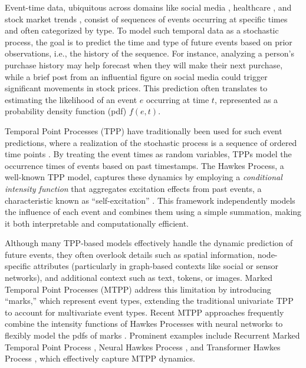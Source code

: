 Event-time data, ubiquitous across domains like social media \cite{seismic, snapnets}, healthcare \cite{bib:RMTPP, meng2023dynamic}, and stock market trends \cite{Bacry2014MarketIA, hawkesInFinance}, 
consist of sequences of events occurring at specific times and often categorized by type. 
To model such temporal data as a stochastic process, the goal is to predict the time and type of future events based on prior observations, i.e., the history of the sequence. 
For instance, analyzing a person’s purchase history may help forecast when they will make their next purchase, while a brief post from an influential figure on social media could trigger significant movements in stock prices. 
This prediction often translates to estimating the likelihood of an event $e$ occurring at time $t$, represented as a probability density function (pdf) $f(e, t)$. 

Temporal Point Processes (TPP) have traditionally been used for such event predictions, where a realization of the stochastic process is a sequence of ordered time points \cite{lec:tpp}. 
By treating the event times as random variables, TPPs model the occurrence times of events based on past timestamps. 
The Hawkes Process, a well-known TPP model, captures these dynamics by employing a \textit{conditional intensity function} that aggregates excitation effects from past events, a characteristic known as ``self-excitation'' \cite{bib:hawkesOrigin,bib:hawkes}. 
This framework independently models the influence of each event and combines them using a simple summation, making it both interpretable and computationally efficient. 

Although many TPP-based models effectively handle the dynamic prediction of future events, 
they often overlook details such as spatial information, node-specific attributes (particularly in graph-based contexts like social or sensor networks), and additional context such as text, tokens, or images. 
Marked Temporal Point Processes (MTPP) address this limitation by introducing ``marks,'' which represent event types, extending the traditional univariate TPP to account for multivariate event types. 
Recent MTPP approaches frequently combine the intensity functions of Hawkes Processes with neural networks to flexibly model the pdfs of marks \cite{bib:nhp, bib:NJSDE, bib:sahp, bib:STPP, bib:ANHP}. 
Prominent examples include Recurrent Marked Temporal Point Process \cite{bib:RMTPP}, Neural Hawkes Process \cite{bib:nhp}, and Transformer Hawkes Process \cite{bib:THP}, which effectively capture MTPP dynamics. 


